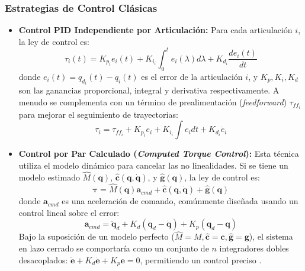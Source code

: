 \documentclass[12pt]{article}
\begin{document}
\subsubsection{Estrategias de Control Clásicas}
\label{sssec:control_clasico}
\begin{itemize}
    \item \textbf{Control PID Independiente por Articulación:} Para cada articulación $i$, la ley de control es:
    \begin{equation}
    \tau_i(t) = K_{p_i} e_i(t) + K_{i_i} \int_0^t e_i(\lambda) d\lambda + K_{d_i} \frac{de_i(t)}{dt}
    \label{eq:pid_control}
    \end{equation}
    donde $e_i(t) = q_{d_i}(t) - q_i(t)$ es el error de la articulación $i$, y $K_p, K_i, K_d$ son las ganancias proporcional, integral y derivativa respectivamente. A menudo se complementa con un término de prealimentación (\textit{feedforward}) $\tau_{ff_i}$ para mejorar el seguimiento de trayectorias\cite{modern_robotics}:
    \begin{equation}
    \tau_i = \tau_{ff_i} + K_{p_i} e_i + K_{i_i} \int e_i dt + K_{d_i} \dot{e}_i
    \label{eq:pid_ff_control}
    \end{equation}
    

    \item \textbf{Control por Par Calculado (\textit{Computed Torque Control}):} Esta técnica utiliza el modelo dinámico para cancelar las no linealidades. Si se tiene un modelo estimado $\hat{M}(\bm{q})$, $\hat{\bm{c}}(\bm{q},\dot{\bm{q}})$, y $\hat{\bm{g}}(\bm{q})$, la ley de control es:
    \begin{equation}
    \bm{\tau} = \hat{M}(\bm{q})\bm{a}_{cmd} + \hat{\bm{c}}(\bm{q},\dot{\bm{q}}) + \hat{\bm{g}}(\bm{q})
    \label{eq:computed_torque}
    \end{equation}
    donde $\bm{a}_{cmd}$ es una aceleración de comando, comúnmente diseñada usando un control lineal sobre el error:
    \begin{equation}
    \bm{a}_{cmd} = \ddot{\bm{q}}_d + K_d (\dot{\bm{q}}_d - \dot{\bm{q}}) + K_p (\bm{q}_d - \bm{q})
    \label{eq:acmd_ctc}
    \end{equation}
    Bajo la suposición de un modelo perfecto ($\hat{M}=M, \hat{\bm{c}}=\bm{c}, \hat{\bm{g}}=\bm{g}$), el sistema en lazo cerrado se comportaría como un conjunto de $n$ integradores dobles desacoplados: $\ddot{\bm{e}} + K_d \dot{\bm{e}} + K_p \bm{e} = 0$, permitiendo un control preciso \cite{modern_robotics}.
\end{itemize}
\end{document}
